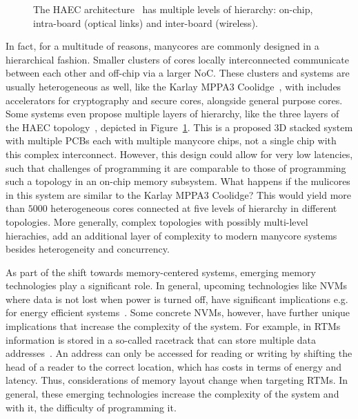 \begin{figure}[h]
	\centering
   \resizebox{0.5\textwidth}{!}{}
   \caption{The HAEC architecture~\cite{HAEC} has multiple levels of hierarchy: on-chip, intra-board (optical links) and inter-board (wireless).} 
	\label{fig:haec}
\end{figure}

In fact, for a multitude of reasons, manycores are commonly designed in a hierarchical fashion.
Smaller clusters of cores locally interconnected communicate between each other and off-chip via a larger \ac{NoC}.
These clusters and systems are usually heterogeneous as well, like the Karlay MPPA3 Coolidge~\cite{coolidge}, with includes accelerators for cryptography and secure cores, alongside general purpose cores.
Some systems even propose multiple layers of hierarchy, like the three layers of the HAEC topology~\cite{HAEC}, depicted in Figure~\ref{fig:haec}.
This is a proposed 3D stacked system with multiple \acp{PCB} each with multiple manycore chips, not a single chip with this complex interconnect.
However, this design could allow for very low latencies, such that challenges of programming it are comparable to those of programming such a topology in an on-chip memory subsystem.
What happens if the mulicores in this system are similar to the Karlay MPPA3 Coolidge? This would yield more than $5000$ heterogeneous cores connected at five levels of hierarchy in different topologies.
More generally, complex topologies with possibly multi-level hierachies, add an additional layer of complexity to modern manycore systems besides heterogeneity and concurrency.

As part of the shift towards memory-centered systems, emerging memory technologies play a significant role.
In general, upcoming technologies like \acp{NVM} where data is not lost when power is turned off, have significant implications e.g. for energy efficient systems~\cite{meena2014nvm,mittal2014survey}.
Some concrete \acp{NVM}, however, have further unique implications that increase the complexity of the system.
For example, in \acp{RTM} information is stored in a so-called racetrack that can store multiple data addresses~\cite{rtm}.
An address can only be accessed for reading or writing by shifting the head of a reader to the correct location, which has costs in terms of energy and latency.
Thus, considerations of memory layout change when targeting \acp{RTM}.
In general, these emerging technologies increase the complexity of the system and with it, the difficulty of programming it.

